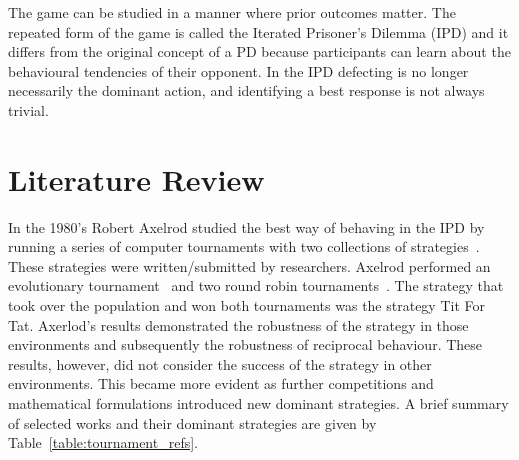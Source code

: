 The game can be studied in a manner where prior outcomes matter. The repeated
form of the game is called the Iterated Prisoner's Dilemma (IPD) and it differs
from the original concept of a PD because participants can learn about the
behavioural tendencies of their opponent. In the IPD defecting is no
longer necessarily the dominant action, and identifying a best response is not
always trivial.

\section{Literature Review}\label{section:introduction_brief_literature}

In the 1980's Robert Axelrod studied the best way of behaving in the IPD by
running a series of computer tournaments with two collections of
strategies~\cite{Axelrod1984}. These strategies were written/submitted by
researchers. Axelrod performed an evolutionary tournament~\cite{Axelrod1981} and
two round robin tournaments~\cite{Axelrod1980a, Axelrod1980b}. The strategy that
took over the population and won both tournaments was the strategy Tit For Tat.
Axerlod's results demonstrated the robustness of the strategy in those
environments and subsequently the robustness of reciprocal behaviour. These
results, however, did not consider the success of the strategy in other
environments. This became more evident as further competitions and mathematical
formulations introduced new dominant strategies. A
brief summary of selected works and their dominant strategies are given by
Table~\ref{table:tournament_refs}.

